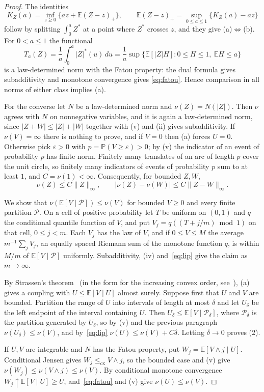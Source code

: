 \documentclass[11pt]{amsart}
\theoremstyle{definition}
\newcommand{\Prob}{\mathbb{P}}
\newcommand{\E}{\mathbb{E}}
\newcommand{\cx}{\le_{\mathrm{cx}}}
\begin{document}
\begin{proof}
The identities
\[
K_Z(a)=\inf_{z\ge0}\{az+\E(Z-z)_+\},\qquad\E(Z-z)_+=\sup_{0\le a\le1}\{K_Z(a)-az\}
\]
follow by splitting $\int_0^aZ^*$ at a point where $Z^*$ crosses $z$, and they give (a)$\Leftrightarrow$(b). For
$0<a\le1$ the functional
\[
T_a(Z)=\frac1a\int_0^a|Z|^*(u)\,du=\frac1a\sup\{\E[|Z|H]:0\le H\le1,\ \E H\le a\}
\]
is a law-determined norm with the Fatou property: the dual formula gives subadditivity and monotone convergence gives
\eqref{eq:fatou}. Hence comparison in all norms of either class implies (a).

For the converse let $N$ be a law-determined norm and $\nu(Z)=N(|Z|)$. Then $\nu$ agrees with $N$ on nonnegative
variables, and it is again a law-determined norm, since $|Z+W|\le|Z|+|W|$ together with (v) and (ii) gives
subadditivity. If $\nu(V)=\infty$ there is nothing to prove, and if $V=0$ then (a) forces $U=0$. Otherwise pick
$\varepsilon>0$ with $p=\Prob(V\ge\varepsilon)>0$; by (v) the indicator of an event of probability $p$ has finite
norm. Finitely many translates of an arc of length $p$ cover the unit circle, so finitely many indicators of events of
probability $p$ sum to at least $1$, and $C=\nu(1)<\infty$. Consequently, for bounded $Z,W$,
\begin{equation}\label{eq:lip}
\nu(Z)\le C\|Z\|_\infty,\qquad|\nu(Z)-\nu(W)|\le C\|Z-W\|_\infty.
\end{equation}

We show that $\nu(\E[V\mid\mathcal P])\le\nu(V)$ for bounded $V\ge0$ and every finite partition $\mathcal P$. On a cell
of positive probability let $T$ be uniform on $(0,1)$ and $q$ the conditional quantile function of $V$, and put
$V_j=q((T+j/m)\bmod1)$ on that cell, $0\le j<m$. Each $V_j$ has the law of $V$, and if $0\le V\le M$ the average
$m^{-1}\sum_jV_j$, an equally spaced Riemann sum of the monotone function $q$, is within $M/m$ of
$\E[V\mid\mathcal P]$ uniformly. Subadditivity, (iv) and~\eqref{eq:lip} give the claim as $m\to\infty$.

By Strassen's theorem~\cite[Theorem~9]{Str65} (in the form for the increasing convex order,
see~\cite[Theorem~4.A.5]{SS07}), (a) gives a coupling with $U\le\E[V\mid U]$ almost surely. Suppose first that $U$ and
$V$ are bounded. Partition the range of $U$ into intervals of length at most $\delta$ and let $U_\delta$ be the left
endpoint of the interval containing $U$. Then $U_\delta\le\E[V\mid\mathcal P_\delta]$, where $\mathcal P_\delta$ is the
partition generated by $U_\delta$, so by (v) and the previous paragraph $\nu(U_\delta)\le\nu(V)$, and
by~\eqref{eq:lip} $\nu(U)\le\nu(V)+C\delta$. Letting $\delta\to0$ proves (2).

If $U,V$ are integrable and $N$ has the Fatou property, put $W_j=\E[V\wedge j\mid U]$. Conditional Jensen gives
$W_j\cx V\wedge j$, so the bounded case and (v) give $\nu(W_j)\le\nu(V\wedge j)\le\nu(V)$. By conditional monotone
convergence $W_j\uparrow\E[V\mid U]\ge U$, and~\eqref{eq:fatou} and (v) give $\nu(U)\le\nu(V)$.
\end{proof}
\end{document}
